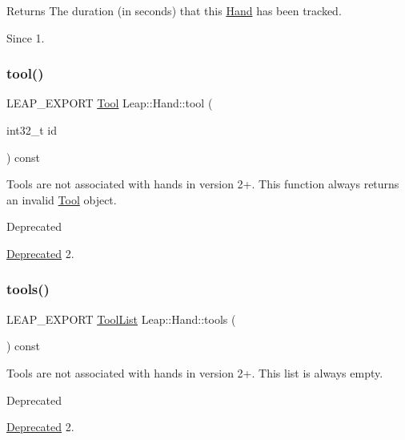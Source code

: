 \begin{DoxyReturn}{Returns}
The duration (in seconds) that this \hyperlink{class_leap_1_1_hand}{Hand} has been tracked. 
\end{DoxyReturn}
\begin{DoxySince}{Since}
1. 
\end{DoxySince}
\mbox{\label{class_leap_1_1_hand_a1d66d728af5d56f6021ab62090c8c77d}} 
\subsubsection{\texorpdfstring{tool()}{tool()}}
{\footnotesize\ttfamily L\+E\+A\+P\+\_\+\+E\+X\+P\+O\+RT \hyperlink{class_leap_1_1_tool}{Tool} Leap\+::\+Hand\+::tool (\begin{DoxyParamCaption}\item[{int32\+\_\+t}]{id }\end{DoxyParamCaption}) const}

Tools are not associated with hands in version 2+. This function always returns an invalid \hyperlink{class_leap_1_1_tool}{Tool} object.

\begin{DoxyRefDesc}{Deprecated}
\item[\hyperlink{deprecated__deprecated000002}{Deprecated}]2. \end{DoxyRefDesc}
\mbox{\label{class_leap_1_1_hand_a715c211881d94e441eab3110b5075a0f}} 
\subsubsection{\texorpdfstring{tools()}{tools()}}
{\footnotesize\ttfamily L\+E\+A\+P\+\_\+\+E\+X\+P\+O\+RT \hyperlink{class_leap_1_1_tool_list}{Tool\+List} Leap\+::\+Hand\+::tools (\begin{DoxyParamCaption}{ }\end{DoxyParamCaption}) const}

Tools are not associated with hands in version 2+. This list is always empty.

\begin{DoxyRefDesc}{Deprecated}
\item[\hyperlink{deprecated__deprecated000001}{Deprecated}]2. \end{DoxyRefDesc}
\mbox{\label{class_leap_1_1_hand_aadce42e29675b791f85aa39056e7d585}} 
